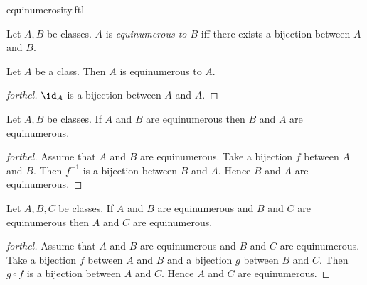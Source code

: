 \documentclass{naproche-library}
\begin{document}
\begin{smodule}[title=Equinumerosity]{equinumerosity.ftl}

\begin{definition}[forthel,id=FOUNDATIONS_13_4578620297183232]
  Let $A, B$ be classes.
  $A$ is \emph{equinumerous to $B$} iff there exists a bijection between $A$ and $B$.
\end{definition}

\begin{proposition}[forthel,id=FOUNDATIONS_13_3703161885818880]
  Let $A$ be a class.
  Then $A$ is equinumerous to $A$.
\end{proposition}
\begin{proof}[forthel]
  $\id_{A}$ is a bijection between $A$ and $A$.
\end{proof}

\begin{proposition}[forthel,id=FOUNDATIONS_13_8050301789536256]
  Let $A, B$ be classes.
  If $A$ and $B$ are equinumerous then $B$ and $A$ are equinumerous.
\end{proposition}
\begin{proof}[forthel]
  Assume that $A$ and $B$ are equinumerous.
  Take a bijection $f$ between $A$ and $B$.
  Then $f^{-1}$ is a bijection between $B$ and $A$.
  Hence $B$ and $A$ are equinumerous.
\end{proof}

\begin{proposition}[forthel,id=FOUNDATIONS_13_3609912414306304]
  Let $A, B, C$ be classes.
  If $A$ and $B$ are equinumerous and $B$ and $C$ are equinumerous then $A$ and $C$ are equinumerous.
\end{proposition}
\begin{proof}[forthel]
  Assume that $A$ and $B$ are equinumerous and $B$ and $C$ are equinumerous.
  Take a bijection $f$ between $A$ and $B$ and a bijection $g$ between $B$ and $C$.
  Then $g \circ f$ is a bijection between $A$ and $C$.
  Hence $A$ and $C$ are equinumerous.
\end{proof}
\end{smodule}
\end{document}
